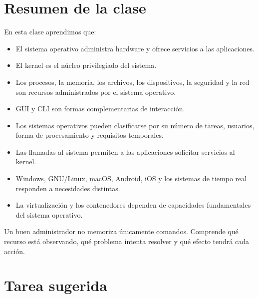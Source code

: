 \documentclass[
  spanish,
  letterpaper,
]{scrbook}
\providecommand{\tightlist}{%
  \setlength{\itemsep}{0pt}\setlength{\parskip}{0pt}}
\begin{document}
\chapter{Resumen de la clase}\label{resumen-de-la-clase}

En esta clase aprendimos que:

\begin{itemize}
\tightlist
\item
  El sistema operativo administra hardware y ofrece servicios a las
  aplicaciones.
\item
  El kernel es el núcleo privilegiado del sistema.
\item
  Los procesos, la memoria, los archivos, los dispositivos, la seguridad
  y la red son recursos administrados por el sistema operativo.
\item
  GUI y CLI son formas complementarias de interacción.
\item
  Los sistemas operativos pueden clasificarse por su número de tareas,
  usuarios, forma de procesamiento y requisitos temporales.
\item
  Las llamadas al sistema permiten a las aplicaciones solicitar
  servicios al kernel.
\item
  Windows, GNU/Linux, macOS, Android, iOS y los sistemas de tiempo real
  responden a necesidades distintas.
\item
  La virtualización y los contenedores dependen de capacidades
  fundamentales del sistema operativo.
\end{itemize}

\begin{tcolorbox}[enhanced jigsaw, arc=.35mm, bottomrule=.15mm, bottomtitle=1mm, breakable, colback=white, colbacktitle=quarto-callout-tip-color!10!white, colframe=quarto-callout-tip-color-frame, coltitle=black, left=2mm, leftrule=.75mm, opacityback=0, opacitybacktitle=0.6, rightrule=.15mm, title=\textcolor{quarto-callout-tip-color}{\faLightbulb}\hspace{0.5em}{Consejo final del Ingeniero}, titlerule=0mm, toprule=.15mm, toptitle=1mm]

Un buen administrador no memoriza únicamente comandos. Comprende qué
recurso está observando, qué problema intenta resolver y qué efecto
tendrá cada acción.

\end{tcolorbox}


\chapter{Tarea sugerida}\label{tarea-sugerida}
\end{document}
